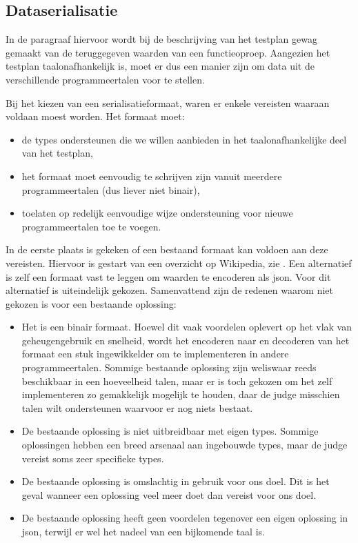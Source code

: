\subsection{Dataserialisatie}\label{subsec:dataserialisatie}

In de paragraaf hiervoor wordt bij de beschrijving van het testplan gewag gemaakt van de teruggegeven waarden van een functieoproep.
Aangezien het testplan taalonafhankelijk is, moet er dus een manier zijn om data uit de verschillende programmeertalen voor te stellen.

Bij het kiezen van een serialisatieformaat, waren er enkele vereisten waaraan voldaan moest worden.
Het formaat moet:

\begin{itemize}
    \item de types ondersteunen die we willen aanbieden in het taalonafhankelijke deel van het testplan,
    \item het formaat moet eenvoudig te schrijven zijn vanuit meerdere programmeertalen (dus liever niet binair),
    \item toelaten op redelijk eenvoudige wijze ondersteuning voor nieuwe programmeertalen toe te voegen.
\end{itemize}

In de eerste plaats is gekeken of een bestaand formaat kan voldoen aan deze vereisten.
Hiervoor is gestart van een overzicht op Wikipedia, zie \autocite{wiki2020}.
Een alternatief is zelf een formaat vast te leggen om waarden te encoderen als json.
Voor dit alternatief is uiteindelijk gekozen.
Samenvattend zijn de redenen waarom niet gekozen is voor een bestaande oplossing:

\begin{itemize}
    \item Het is een binair formaat.
    Hoewel dit vaak voordelen oplevert op het vlak van geheugengebruik en snelheid, wordt het encoderen naar en decoderen van het formaat een stuk ingewikkelder om te implementeren in andere programmeertalen.
    Sommige bestaande oplossing zijn weliswaar reeds beschikbaar in een hoeveelheid talen, maar er is toch gekozen om het zelf implementeren zo gemakkelijk mogelijk te houden, daar de judge misschien talen wilt ondersteunen waarvoor er nog niets bestaat.
    \item De bestaande oplossing is niet uitbreidbaar met eigen types.
    Sommige oplossingen hebben een breed arsenaal aan ingebouwde types, maar de judge vereist soms zeer specifieke types.
    \item De bestaande oplossing is omslachtig in gebruik voor ons doel.
    Dit is het geval wanneer een oplossing veel meer doet dan vereist voor ons doel.
    \item De bestaande oplossing heeft geen voordelen tegenover een eigen oplossing in json, terwijl er wel het nadeel van een bijkomende taal is.
\end{itemize}

